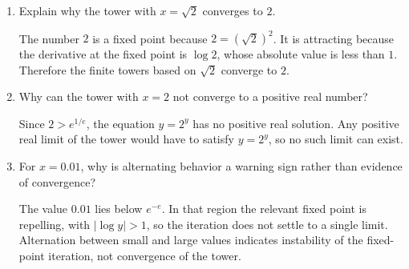\documentclass{essay}
\begin{document}
\begin{enumerate}
  \item Explain why the tower with \(x=\sqrt{2}\) converges to \(2\).
    \begin{answer}
      The number \(2\) is a fixed point because
      \(2=(\sqrt{2})^{2}\). It is attracting because the derivative at the fixed
      point is \(\log 2\), whose absolute value is less than \(1\). Therefore
      the finite towers based on \(\sqrt{2}\) converge to \(2\).
    \end{answer}

  \item Why can the tower with \(x=2\) not converge to a positive real number?
    \begin{answer}
      Since \(2>e^{1/e}\), the equation \(y=2^{y}\) has no positive real
      solution. Any positive real limit of the tower would have to satisfy
      \(y=2^{y}\), so no such limit can exist.
    \end{answer}

  \item For \(x=0.01\), why is alternating behavior a warning sign rather than
    evidence of convergence?
    \begin{answer}
      The value \(0.01\) lies below \(e^{-e}\). In that region the relevant
      fixed point is repelling, with \(|\log y|>1\), so the iteration does not
      settle to a single limit. Alternation between small and large values
      indicates instability of the fixed-point iteration, not convergence of
      the tower.
    \end{answer}
\end{enumerate}
\end{document}
